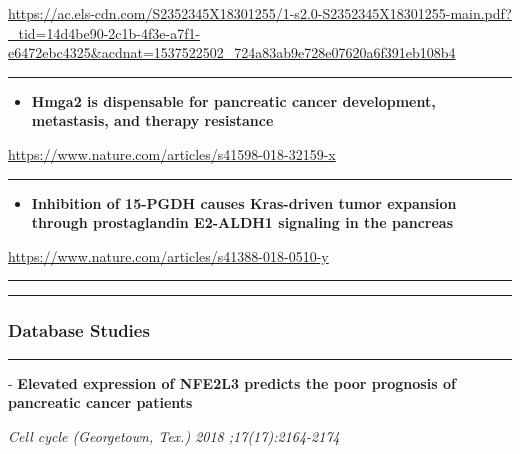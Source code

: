 \documentclass[]{article}
\providecommand{\tightlist}{%
  \setlength{\itemsep}{0pt}\setlength{\parskip}{0pt}}
\begin{document}
\url{https://ac.els-cdn.com/S2352345X18301255/1-s2.0-S2352345X18301255-main.pdf?_tid=14d4be90-2c1b-4f3e-a7f1-e6472ebc4325\&acdnat=1537522502_724a83ab9e728e07620a6f391eb108b4}

\begin{center}\rule{0.5\linewidth}{\linethickness}\end{center}

\begin{itemize}
\tightlist
\item
  \textbf{Hmga2 is dispensable for pancreatic cancer development,
  metastasis, and therapy resistance}
\end{itemize}

\url{https://www.nature.com/articles/s41598-018-32159-x}

\begin{center}\rule{0.5\linewidth}{\linethickness}\end{center}

\begin{itemize}
\tightlist
\item
  \textbf{Inhibition of 15-PGDH causes Kras-driven tumor expansion
  through prostaglandin E2-ALDH1 signaling in the pancreas}
\end{itemize}

\url{https://www.nature.com/articles/s41388-018-0510-y}

\begin{center}\rule{0.5\linewidth}{\linethickness}\end{center}

\begin{center}\rule{0.5\linewidth}{\linethickness}\end{center}

\hypertarget{database-studies}{%
\subsubsection{Database Studies}\label{database-studies}}

\begin{center}\rule{0.5\linewidth}{\linethickness}\end{center}

 - \textbf{Elevated expression of NFE2L3 predicts the poor prognosis of
pancreatic cancer patients}

\emph{Cell cycle (Georgetown, Tex.) 2018 ;17(17):2164-2174}
\end{document}
